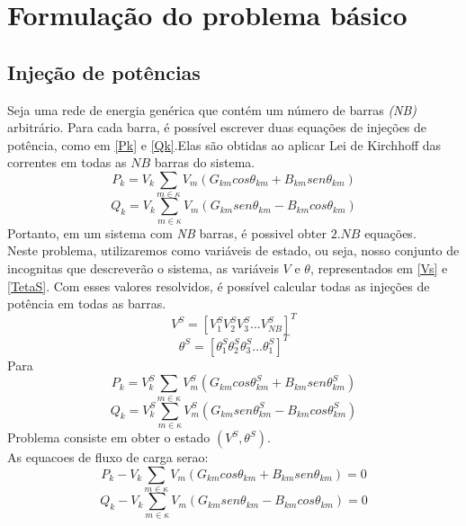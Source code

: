 \section{Formula\c{c}\~ao do problema b\'asico}

\subsection{Injeção de potências}

Seja uma rede de energia gen\'erica que cont\'em um n\'umero de barras \textit{(NB)} arbitr\'ario. Para cada barra, \'e poss\'ivel escrever duas equa\c{c}\~oes de inje\c{c}\~oes de pot\^encia, como em \ref{Pk} e \ref{Qk}.Elas são obtidas ao aplicar Lei de Kirchhoff das correntes em todas as $NB$ barras do sistema.\\
\begin{equation}
    P_k = V_k \sum_{m\in \kappa} V_m (G_{km} cos\theta_{km} + B_{km}sen\theta_{km})
    \label{Pk}
\end{equation}
\begin{equation}
    Q_k = V_k \sum_{m\in \kappa} V_m (G_{km} sen\theta_{km} - B_{km}cos\theta_{km})
    \label{Qk}
\end{equation}
Portanto, em um sistema com \textit{NB} barras, \'e possivel obter $2.NB$ equa\c{c}\~oes.\\
Neste problema, utilizaremos como variáveis de estado, ou seja, nosso conjunto de incognitas que descreverão o sistema, as variáveis $V$ e $\theta$, representados em \ref{Vs} e \ref{TetaS}. Com esses valores resolvidos, \'e possível calcular todas as injeções de potência em todas as barras.\\
\begin{equation}
    V^S = [V_1^S V_2^S V_3^S ... V_{NB}^S]^T
    \label{Vs}
\end{equation}
\begin{equation}
    \theta^S = [\theta_1^S \theta_2^S \theta_3^S ... \theta_1^S]^T
    \label{TetaS}
\end{equation}
Para\\ 
\begin{equation}
    P_k = V_k^S \sum_{m\in \kappa} V_m^S (G_{km} cos\theta_{km}^S + B_{km}sen\theta_{km}^S)
    \label{Pk_s}
\end{equation}
\begin{equation}
    Q_k = V_k^S \sum_{m\in \kappa} V_m^S (G_{km} sen\theta_{km}^S - B_{km}cos\theta_{km}^S)
    \label{Qk_s}
\end{equation}
Problema consiste em obter o estado $(V^S,\theta^S)$.\\
As equacoes de fluxo de carga serao:
\begin{equation}
    P_k - V_k \sum_{m\in \kappa} V_m (G_{km} cos\theta_{km} + B_{km}sen\theta_{km}) = 0
    \label{Pk_balanceado}
\end{equation}
\begin{equation}
    Q_k - V_k \sum_{m\in \kappa} V_m (G_{km} sen\theta_{km} - B_{km}cos\theta_{km}) = 0
    \label{Qk_balanceado}
\end{equation}


